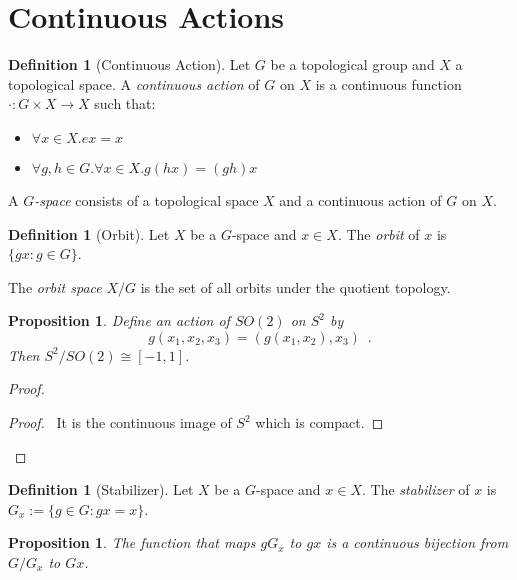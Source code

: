 \documentclass{book}
\let\qed\relax
\newtheorem{prop}[ax]{Proposition}
\theoremstyle{definition}
\newtheorem{df}[ax]{Definition}
\begin{document}
\section{Continuous Actions}

\begin{df}[Continuous Action]
Let $G$ be a topological group and $X$ a topological space. A \emph{continuous action} of $G$ on $X$ is a continuous function $\cdot : G \times X \rightarrow X$ such that:
\begin{itemize}
\item $\forall x \in X. ex = x$
\item $\forall g,h \in G. \forall x \in X. g(hx) = (gh)x$
\end{itemize}

A \emph{$G$-space} consists of a topological space $X$ and a continuous action of $G$ on $X$.
\end{df}

\begin{df}[Orbit]
Let $X$ be a $G$-space and $x \in X$. The \emph{orbit} of $x$ is $\{ gx : g \in G \}$.

The \emph{orbit space} $X / G$ is the set of all orbits under the quotient topology.
\end{df}

\begin{prop}
Define an action of $SO(2)$ on $S^2$ by 
\[ g(x_1, x_2, x_3) = (g(x_1, x_2), x_3) \enspace . \] Then $S^2 / SO(2) \cong [-1,1]$.
\end{prop}

\begin{proof}
\pf
{}
\begin{proof}
	\pf\ It is the continuous image of $S^2$ which is compact.
\end{proof}
\qed
\end{proof}

\begin{df}[Stabilizer]
Let $X$ be a $G$-space and $x \in X$. The \emph{stabilizer} of $x$ is $G_x := \{ g \in G : gx = x \}$.
\end{df}

\begin{prop}
The function that maps $gG_x$ to $gx$ is a continuous bijection from $G / G_x$ to $Gx$.
\end{prop}
\end{document}
